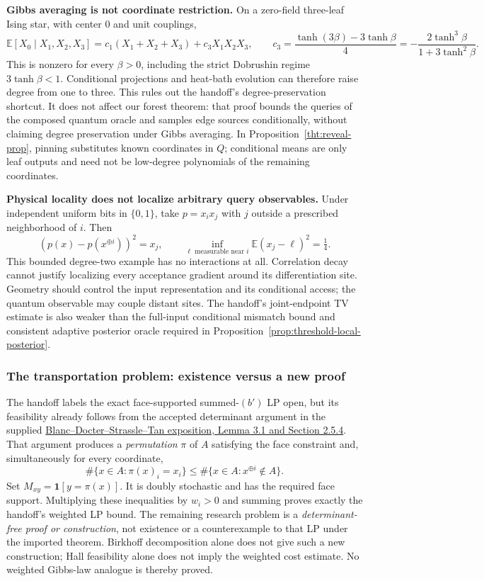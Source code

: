 \textbf{Gibbs averaging is not coordinate restriction.} On a zero-field
three-leaf Ising star, with center 0 and unit couplings,
\[
 \mathbb E[X_0\mid X_1,X_2,X_3]
 =c_1(X_1+X_2+X_3)+c_3X_1X_2X_3,
 \qquad
 c_3=\frac{\tanh(3\beta)-3\tanh\beta}{4}
     =-\frac{2\tanh^3\beta}{1+3\tanh^2\beta}.
\]
This is nonzero for every $\beta>0$, including the strict Dobrushin
regime $3\tanh\beta<1$. Conditional projections and heat-bath
evolution can therefore raise degree from one to three. This rules out
the handoff's degree-preservation shortcut. It does not affect our
forest theorem: that proof bounds the queries of the composed quantum
oracle and samples edge sources conditionally, without claiming degree
preservation under Gibbs averaging. In
Proposition~\ref{tht:reveal-prop}, pinning substitutes known coordinates
in $Q$; conditional means are only leaf outputs and need not be
low-degree polynomials of the remaining coordinates.

\textbf{Physical locality does not localize arbitrary query observables.}
Under independent uniform bits in $\{0,1\}$, take $p=x_ix_j$ with $j$
outside a prescribed neighborhood of $i$. Then
\[
 (p(x)-p(x^{\oplus i}))^2=x_j,
 \qquad
 \inf_{\ell\text{ measurable near }i}\mathbb E(x_j-\ell)^2=\tfrac14.
\]
This bounded degree-two example has no interactions at all. Correlation
decay cannot justify localizing every acceptance gradient around its
differentiation site. Geometry should control the input representation
and its conditional access; the quantum observable may couple distant
sites. The handoff's joint-endpoint TV estimate is also weaker than
the full-input conditional mismatch bound and consistent adaptive
posterior oracle required in
Proposition~\ref{prop:threshold-local-posterior}.

\subsubsection{The transportation problem: existence versus a new proof}

The handoff labels the exact face-supported summed-$(b')$ LP open, but
its feasibility already follows from the accepted determinant argument
in the supplied
\href{https://arxiv.org/abs/2611.11626}{Blanc--Docter--Strassle--Tan
exposition, Lemma 3.1 and Section 2.5.4}. That argument produces a
\emph{permutation} $\pi$ of $A$ satisfying the face constraint and,
simultaneously for every coordinate,
\[
 \#\{x\in A:\pi(x)_i=x_i\}
 \le\#\{x\in A:x^{\oplus i}\notin A\}.
\]
Set $M_{xy}=\mathbf1[y=\pi(x)]$. It is doubly stochastic and has the
required face support. Multiplying these inequalities by $w_i>0$ and
summing proves exactly the handoff's weighted LP bound. The remaining
research problem is a \emph{determinant-free proof or construction},
not existence or a counterexample to that LP under the imported theorem.
Birkhoff decomposition alone does not give such a new construction;
Hall feasibility alone does not imply the weighted cost estimate.
No weighted Gibbs-law analogue is thereby proved.


